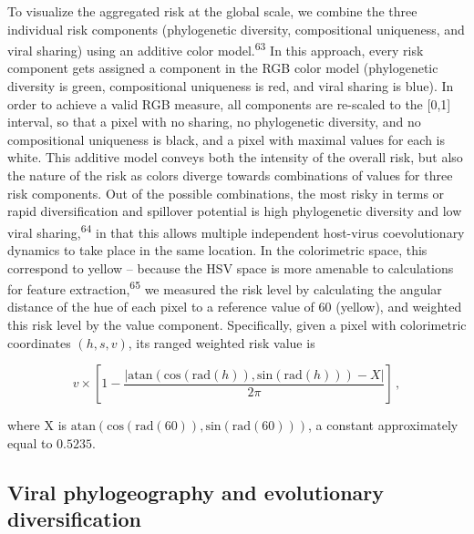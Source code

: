 \documentclass[11pt]{article}
\begin{document}
To visualize the aggregated risk at the global scale, we combine the
three individual risk components (phylogenetic diversity, compositional
uniqueness, and viral sharing) using an additive color
model.\textsuperscript{63} In this approach, every risk component gets
assigned a component in the RGB color model (phylogenetic diversity is
green, compositional uniqueness is red, and viral sharing is blue). In
order to achieve a valid RGB measure, all components are re-scaled to
the {[}0,1{]} interval, so that a pixel with no sharing, no phylogenetic
diversity, and no compositional uniqueness is black, and a pixel with
maximal values for each is white. This additive model conveys both the
intensity of the overall risk, but also the nature of the risk as colors
diverge towards combinations of values for three risk components. Out of
the possible combinations, the most risky in terms or rapid
diversification and spillover potential is high phylogenetic diversity
and low viral sharing,\textsuperscript{64} in that this allows multiple
independent host-virus coevolutionary dynamics to take place in the same
location. In the colorimetric space, this correspond to yellow --
because the HSV space is more amenable to calculations for feature
extraction,\textsuperscript{65} we measured the risk level by
calculating the angular distance of the hue of each pixel to a reference
value of 60 (yellow), and weighted this risk level by the value
component. Specifically, given a pixel with colorimetric coordinates
\((h,s,v)\), its ranged weighted risk value is

\[
v\times\left[1-\frac{\left|\text{atan}\left(\text{cos}(\text{rad}(h)), \text{sin}(\text{rad}(h))\right) - X\right|}{2\pi}\right]\,,
\]

where X is
\(\text{atan}\left(\text{cos}(\text{rad}(60)), \text{sin}(\text{rad}(60))\right)\),
a constant approximately equal to \(0.5235\).

\hypertarget{viral-phylogeography-and-evolutionary-diversification}{%
\subsection{Viral phylogeography and evolutionary
diversification}\label{viral-phylogeography-and-evolutionary-diversification}}
\end{document}
